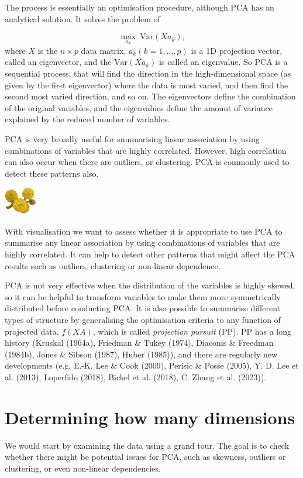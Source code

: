 \documentclass[
  letterpaper,
]{krantz}
\newcommand{\infobox}[1]{%
\noindent\colorbox{info!30}{%
\begin{minipage}{0.98\linewidth}%
    \centering%
    \begin{minipage}[c]{0.15\linewidth} %
      \includegraphics[width=1.5cm]{images/mulga-flowers2.png} %
    \end{minipage}%
    \hfill %
    \begin{minipage}[c]{0.8\linewidth} %
      \bigskip%
      \textsf{#1}%
      \bigskip%
    \end{minipage}%
    \hspace*{3mm}%
  \end{minipage}%
}%
}
\begin{document}
The process is essentially an optimisation procedure, although PCA has
an analytical solution. It solves the problem of

\[
\max_{a_k} ~\text{Var} (Xa_k),
\] where \(X\) is the \(n \times p\) data matrix, \(a_k (k=1, ..., p)\)
is a 1D projection vector, called an eigenvector, and the
\(\text{Var} (Xa_k)\) is called an eigenvalue. So PCA is a sequential
process, that will find the direction in the high-dimensional space (as
given by the first eigenvector) where the data is most varied, and then
find the second most varied direction, and so on. The eigenvectors
define the combination of the original variables, and the eigenvalues
define the amount of variance explained by the reduced number of
variables.

PCA is very broadly useful for summarising linear association by using
combinations of variables that are highly correlated. However, high
correlation can also occur when there are outliers, or clustering. PCA
is commonly used to detect these patterns also.

\infobox{With visualisation we want to assess whether it is appropriate to use PCA to summarise any linear association by using combinations of variables that are highly correlated. It can help to detect other patterns that might affect the PCA results such as outliers, clustering or non-linear dependence.}

PCA is not very effective when the distribution of the variables is
highly skewed, so it can be helpful to transform variables to make them
more symmetrically distributed before conducting PCA. It is also
possible to summarise different types of structure by generalising the
optimisation criteria to any function of projected data, \(f(XA)\),
which is called \emph{projection pursuit} (PP). PP has a long history
(Kruskal (1964a), Friedman \& Tukey (1974), Diaconis \& Freedman
(1984b), Jones \& Sibson (1987), Huber (1985)), and there are regularly
new developments (e.g. E.-K. Lee \& Cook (2009), Perisic \& Posse
(2005), Y. D. Lee et al. (2013), Loperfido (2018), Bickel et al. (2018),
C. Zhang et al. (2023)).

\hypertarget{determining-how-many-dimensions}{%
\section{Determining how many
dimensions}\label{determining-how-many-dimensions}}

We would start by examining the data using a grand tour. The goal is to
check whether there might be potential issues for PCA, such as skewness,
outliers or clustering, or even non-linear dependencies.
\end{document}
